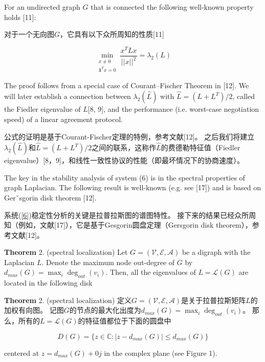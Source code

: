 \documentclass{article}
\begin{document}
{\color[gray]{0.5}
For an undirected graph $G$ that is connected the following well-known property holds [11]:
}

对于一个无向图$G$，它具有以下众所周知的性质[11]

\begin{equation}
    \min_{\substack{x\ne 0\\   \mathbf{1}^Tx=0}} \frac{x^T Lx}{||x||^2}=\lambda_2(L)
    \tag{14}
    \label{14}
\end{equation}

{\color[gray]{0.5}
\noindent The proof follows from a special case of Courant–Fischer Theorem in [12]. 
We will later establish a connection between $\lambda_2(\hat{L})$ with $\hat{L}=(L+L^T)/2$, called the Fiedler eigenvalue of $\hat{L}$[8, 9], and the performance (i.e. worst-case negotiation speed) of a linear agreement protocol.
}

\noindent 公式的证明是基于Courant-Fischer定理的特例，参考文献[12]。
之后我们将建立$\lambda_2(\hat{L})$和$\hat{L}=(L+L^T)/2$之间的联系，这称作$\hat{L}$的费德勒特征值（Fiedler eigenvalue）[8，9]，和线性一致性协议的性能（即最坏情况下的协商速度）。

{\color[gray]{0.5}
The key in the stability analysis of system (6) is in the spectral properties of graph Laplacian. 
The following result is well-known (e.g. see [17]) and is based on Gerˇsgorin disk theorem [12].
}

系统(\ref{6})稳定性分析的关键是拉普拉斯图的谱图特性。
接下来的结果已经众所周知（例如，文献[17]），它是基于Gesgorin圆盘定理（Gersgorin disk theorem），参考文献[12]。

{\color[gray]{0.5}
\noindent \textbf{Theorem} 2. (spectral localization) Let $G=(\mathcal{V},\mathcal{E},\mathcal{A})$ be a digraph with the Laplacian $L$. 
Denote the maximum node out-degree of $G$ by $d_{max}(G) = \max_i \deg_{out}(v_i)$. 
Then, all the eigenvalues of $L=\mathcal{L}(G)$ are located in the following disk
}

\noindent \textbf{Theorem} 2. (spectral localization) 定义$G=(\mathcal{V},\mathcal{E},\mathcal{A})$是关于拉普拉斯矩阵$L$的加权有向图。
记图$G$的节点的最大化出度为$d_{max}(G) = \max_i \deg_{out}(v_i)$。
那么，所有的$L=\mathcal{L}(G)$的特征值都位于下面的圆盘中

\begin{equation}
    D(G) = \{ z\in \mathbb{C}: |z-d_{max}(G)| \le d_{max}(G) \}
    \tag{15}
    \label{15}
\end{equation}

{\color[gray]{0.5}
\noindent centered at $z=d_{max}(G)+0j$ in the complex plane (see Figure 1).
}
\end{document}
